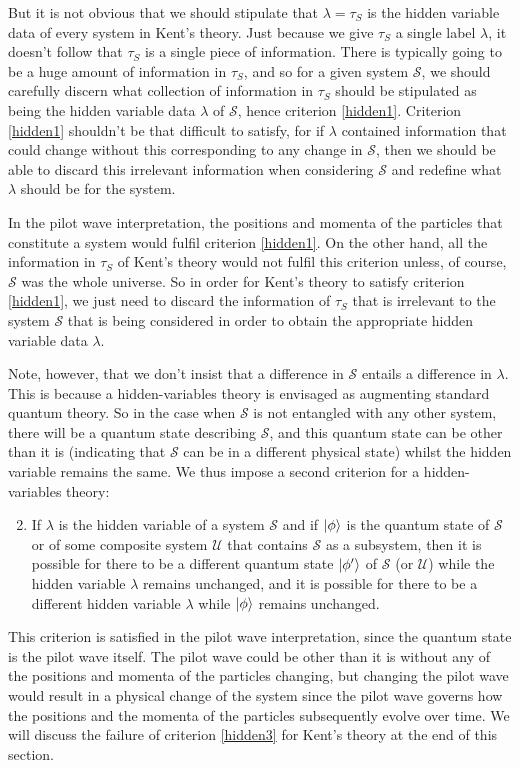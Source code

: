 But it is not obvious that we should stipulate that $\lambda=\tau_S$ is the hidden variable data of every system in Kent's theory. Just because we give $\tau_S$ a single label $\lambda$, it doesn't follow that $\tau_S$ is a single piece of information. There is typically going to be a huge amount of information in $\tau_S$, and so for a given system $\mathcal{S}$, we should carefully discern  what collection of information in $\tau_S$ should be stipulated as being the hidden variable data $\lambda$ of $\mathcal{S}$, hence criterion \ref{hidden1}. Criterion \ref{hidden1} shouldn't be that difficult to satisfy, for if $\lambda$ contained information that could change without this corresponding to any change in $\mathcal{S}$, then we should be able to discard this irrelevant information when considering $\mathcal{S}$ and redefine what $\lambda$ should be for the system. 

In the pilot wave interpretation, the positions and momenta of the particles that constitute a system would fulfil criterion \ref{hidden1}. On the other hand, all the information in $\tau_S$ of Kent's theory would not fulfil this criterion unless, of course, $\mathcal{S}$ was the whole universe. So in order for Kent's theory to satisfy criterion \ref{hidden1}, we just need to discard the information of $\tau_S$ that is irrelevant to the system $\mathcal{S}$ that is being considered in order to obtain the appropriate hidden variable data $\lambda$. 

Note, however, that we don't insist that a difference in $\mathcal{S}$ entails a difference in $\lambda$. This is because a hidden-variables theory is envisaged as augmenting standard quantum theory. So in the case when $\mathcal{S}$ is not entangled with any other system, there will be a quantum state describing $\mathcal{S}$, and this quantum state can be other than it is (indicating that $\mathcal{S}$ can be in a different physical state)  whilst the hidden variable remains the same. We thus impose a second criterion for a hidden-variables theory:
\begin{enumerate}
	\setcounter{enumi}{1}
	\item \label{hidden3} If $\lambda$ is the hidden variable of a system $\mathcal{S}$ and if $\ket{\phi}$ is the quantum state of $\mathcal{S}$ or of some composite system $\mathcal{U}$ that contains $\mathcal{S}$ as a subsystem, then it is possible for there to be a different quantum state $\ket{\phi'}$ of $\mathcal{S}$ (or $\mathcal{U}$) while the hidden variable $\lambda$ remains unchanged, and it is possible for there to be a different hidden variable $\lambda$ while $\ket{\phi}$ remains unchanged.
\end{enumerate} 
This criterion is satisfied in the pilot wave interpretation, since the quantum state is the pilot wave itself. The pilot wave could be other than it is without any of the positions and momenta of the particles changing, but changing the pilot wave would result in a physical change of the system since the pilot wave governs how  the positions and the momenta of the particles subsequently evolve over time. We will discuss the failure of criterion \ref{hidden3} for Kent's theory at the end of this section.

